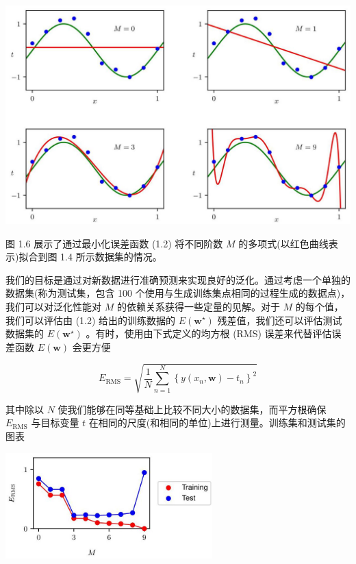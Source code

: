 \documentclass[10pt]{report}
\begin{document}
\begin{center}
\includegraphics[max width=1.0\textwidth]{images/0194e279-9b28-703a-88f4-c3ac21e2010d_29_237_340_1321_836_0.jpg}
\end{center}
\hspace*{3em} 

图 1.6 展示了通过最小化误差函数 (1.2) 将不同阶数 \(M\) 的多项式(以红色曲线表示)拟合到图 1.4 所示数据集的情况。

我们的目标是通过对新数据进行准确预测来实现良好的泛化。通过考虑一个单独的数据集(称为测试集，包含 100 个使用与生成训练集点相同的过程生成的数据点)，我们可以对泛化性能对 \(M\) 的依赖关系获得一些定量的见解。对于 \(M\) 的每个值，我们可以评估由 (1.2) 给出的训练数据的 \(E\left( {\mathbf{w}}^{ \star  }\right)\) 残差值，我们还可以评估测试数据集的 \(E\left( {\mathbf{w}}^{ \star  }\right)\) 。有时，使用由下式定义的均方根 (RMS) 误差来代替评估误差函数 \(E\left( \mathbf{w}\right)\) 会更方便

\[
{E}_{\mathrm{{RMS}}} = \sqrt{\frac{1}{N}\mathop{\sum }\limits_{{n = 1}}^{N}{\left\{  y\left( {x}_{n},\mathbf{w}\right)  - {t}_{n}\right\}  }^{2}} \tag{1.3}
\]

其中除以 \(N\) 使我们能够在同等基础上比较不同大小的数据集，而平方根确保 \({E}_{\mathrm{{RMS}}}\) 与目标变量 \(t\) 在相同的尺度(和相同的单位)上进行测量。训练集和测试集的图表

\begin{center}
\includegraphics[max width=0.6\textwidth]{images/0194e279-9b28-703a-88f4-c3ac21e2010d_30_794_342_754_384_0.jpg}
\end{center}
\hspace*{3em} 
\end{document}
